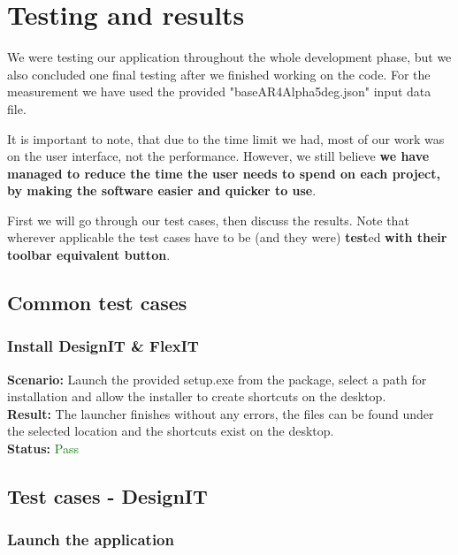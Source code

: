 \documentclass[a4paper, 11pt, article]{report}
\begin{document}

\chapter{Testing and results}

We were testing our application throughout the whole development phase, but we also concluded one final testing after we finished working on the code. For the measurement we have used the provided "baseAR4Alpha5deg.json" input data file.

It is important to note, that due to the time limit we had, most of our work was on the user interface, not the performance. However, we still believe \textbf{we have managed to reduce the time the user needs to spend on each project, by making the software easier and quicker to use}.

First we will go through our test cases, then discuss the results. Note that wherever applicable the test cases have to be (and they were) \textbf{test}ed \textbf{with their toolbar equivalent button}.

\section{Common test cases}

\subsection{Install DesignIT \& FlexIT}

\noindent \textbf{Scenario:} Launch the provided setup.exe from the package, select a path for installation and allow the installer to create shortcuts on the desktop.
\\
\noindent \textbf{Result:} The launcher finishes without any errors, the files can be found under the selected location and the shortcuts exist on the desktop.
\\
\noindent \textbf{Status:} \textcolor{green}{Pass}

\section{Test cases - DesignIT}

\subsection{Launch the application}
\end{document}
